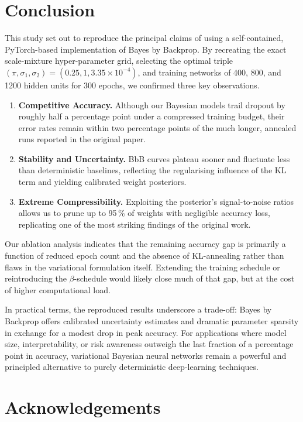 \documentclass{article}
\begin{document}
\section{Conclusion}

This study set out to reproduce the principal claims of \citet{blundell2015weight} using a self-contained, PyTorch-based implementation of Bayes by Backprop.  
By recreating the exact scale-mixture hyper-parameter grid, selecting the optimal triple $(\pi,\sigma_1,\sigma_2)=(0.25,1,3.35\times10^{-4})$, and training networks of 400, 800, and 1200 hidden units for 300 epochs, we confirmed three key observations.  

\begin{enumerate}
\item \textbf{Competitive Accuracy.}  Although our Bayesian models trail dropout by roughly half a percentage point under a compressed training budget, their error rates remain within two percentage points of the much longer, annealed runs reported in the original paper.  
\item \textbf{Stability and Uncertainty.}  BbB curves plateau sooner and fluctuate less than deterministic baselines, reflecting the regularising influence of the KL term and yielding calibrated weight posteriors.  
\item \textbf{Extreme Compressibility.}  Exploiting the posterior’s signal-to-noise ratios allows us to prune up to 95\,\% of weights with negligible accuracy loss, replicating one of the most striking findings of the original work.  
\end{enumerate}

Our ablation analysis indicates that the remaining accuracy gap is primarily a function of reduced epoch count and the absence of KL-annealing rather than flaws in the variational formulation itself.  Extending the training schedule or reintroducing the $\beta$-schedule would likely close much of that gap, but at the cost of higher computational load.

In practical terms, the reproduced results underscore a trade-off: Bayes by Backprop offers calibrated uncertainty estimates and dramatic parameter sparsity in exchange for a modest drop in peak accuracy.  For applications where model size, interpretability, or risk awareness outweigh the last fraction of a percentage point in accuracy, variational Bayesian neural networks remain a powerful and principled alternative to purely deterministic deep-learning techniques.
\section*{Acknowledgements}
\end{document}
